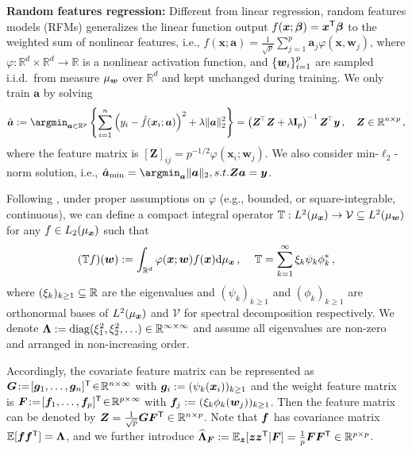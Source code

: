{\bf Random features regression:} Different from linear regression, random features models (RFMs) \citep{rahimi2007random, liu2021random} generalizes the linear function output $f(\bm x; {\bm \beta}) = \bm x^{{\mathsf T}} {\bm \beta}$ to the weighted sum of nonlinear features, i.e., $f(\bm x; \bm a) = \frac{1}{\sqrt{p}} \sum_{j=1}^p \bm a_j \varphi(\bm x, \bm w_j)$, where $\varphi: \mathbb{R}^d \times \mathbb{R}^d \rightarrow \mathbb{R}$ is a nonlinear activation function, and $\{ {\boldsymbol w}_i \}_{i=1}^p$ are sampled i.i.d.\ from measure $\mu_{\boldsymbol w}$ over $\mathbb{R}^d$ and kept unchanged during training.
We only train $\bm a$ by solving
\begin{equation}\label{eq:rffa}
    \begin{split}
        \hat{\ba} := \argmin_{\ba \in \R^p} 
    \left\{ \sum_{i=1}^n \left( y_i - \hat{f}(\bx_i; \ba) \right)^2 
    + \lambda \|\ba\|_2^2 \right\} = \left( \bZ^{\!\top} \bZ + \lambda \id_p \right)^{-1} \bZ^{\!\top} \by\,, \quad \bZ \in \mathbb{R}^{n \times p}\,,
    \end{split}
\end{equation}
where the feature matrix is $[{\bm Z}]_{ij} = p^{-1/2} \varphi(\bm{x}_i; \bm{w}_j)$. We also consider min-$\ell_2$-norm solution, i.e., $\hat{\ba}_{\min} = \argmin_{\ba} \| \ba \|_2, s.t. \bZ \ba = \by$. 

Following \citet{defilippis2024dimension}, under proper assumptions on $\varphi$ (e.g., bounded, or square-integrable, continuous), we can define a compact integral operator $\mathbb{T}:L^2(\mu_{\boldsymbol x}) \to \mathcal{V}  \subseteq L^2(\mu_{\boldsymbol w})$ for any $ f \in L_2(\mu_{\boldsymbol x})$ such that
\[
(\mathbb{T}f)({\boldsymbol w}) := \int_{\mathbb{R}^d} \varphi({\boldsymbol x}; {\boldsymbol w}) f({\boldsymbol x}) \mathrm{d}\mu_{\boldsymbol x} \,,\quad\, \mathbb{T} = \sum_{k=1}^\infty \xi_k \psi_k \phi_k^*\,,
\]
where $(\xi_k)_{k\geq1} \subseteq \mathbb{R}$ are the eigenvalues and $(\psi_k)_{k\geq1}$ and $(\phi_k)_{k\geq1}$ are orthonormal bases of $L^2(\mu_{\boldsymbol x})$ and $\mathcal{V}$ for spectral decomposition respectively. 
We denote ${\boldsymbol \Lambda} := \operatorname{diag}(\xi_1^2, \xi_2^2, \ldots) \in \mathbb{R}^{\infty \times \infty}$ and assume all eigenvalues are non-zero and arranged in non-increasing order.

 Accordingly, the covariate feature matrix can be represented as ${\boldsymbol G} \!:=\! [{\boldsymbol g}_1, \ldots, {\boldsymbol g}_n]^{\mathsf T} \!\in\! \mathbb{R}^{n \times \infty}$ with ${\boldsymbol g}_i := (\psi_k({\boldsymbol x}_i))_{k \geq 1}$ and the weight feature matrix is ${\boldsymbol F} \!:=\! [\boldsymbol{f}_1, \ldots, \boldsymbol{f}_p]^{\mathsf T} \!\in\! \mathbb{R}^{p \times \infty}$ with $\boldsymbol{f}_j := (\xi_k \phi_k({\boldsymbol w}_j))_{k \geq 1}$. Then the feature matrix can be denoted by ${\boldsymbol Z} = \frac{1}{\sqrt{p}} \bm{G} \bm{F}^{\mathsf T} \in \mathbb{R}^{n \times p}$. Note that $\boldsymbol{f}$ has covariance matrix $\mathbb{E}[\boldsymbol{f}\boldsymbol{f}^{\mathsf T}]={\boldsymbol \Lambda}$, and we further introduce $\widehat{{\boldsymbol \Lambda}}_{\boldsymbol F} := \mathbb{E}_{\boldsymbol z}[{\boldsymbol z}{\boldsymbol z}^{\mathsf T}|{\boldsymbol F}] = \frac{1}{p}{\boldsymbol F}{\boldsymbol F}^{\mathsf T} \in \mathbb{R}^{p \times p}$.

